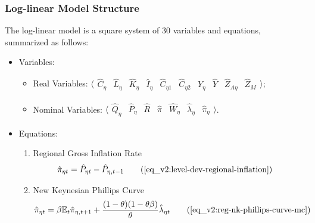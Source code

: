 \documentclass[../thesis.tex]{subfiles}
\begin{document}
\newpage


\subsubsection{Log-linear Model Structure}

The log-linear model is a square system of 30 variables and equations, summarized as follows:

{\singlespacing
	
	\begin{itemize}
		
		\item Variables:
		
		\begin{itemize}
			
			\item Real Variables: $\langle \begin{matrix} \hat{C}_{\eta } & \hat{L}_{\eta } & \hat{K}_{\eta} & \hat{I}_{\eta} & \hat{C}_{\eta 1} & \hat{C}_{\eta 2} & \hat{Y}_{\eta } & \hat{Y}_{} & \hat{Z}_{A\eta } & \hat{Z}_{M} \end{matrix} \rangle$;
			
			\item Nominal Variables: $\langle \begin{matrix} \hat{Q}_{\eta} & \hat{P}_{\eta } & \hat{R}_{} & \hat{\pi}_{} & \hat{W}_{\eta } & \hat{\lambda}_{\eta } & \hat{\pi}_{\eta } \end{matrix} \rangle$.
			
		\end{itemize}
		
		\item Equations:
		
		\begin{enumerate}
			
			\item Regional Gross Inflation Rate
			\begin{align}
				\hat{\pi}_{\eta t} &= \hat{P}_{\eta t} - \hat{P}_{\eta, t-1} \tag{\ref{eq_v2:level-dev-regional-inflation}}
			\end{align}
			
			\item New Keynesian Phillips Curve
			\begin{align}
				\hat{\pi}_{\eta t} &= \beta \E \hat{\pi}_{\eta, t+1} + \frac{(1-\theta) (1- \theta \beta)}{\theta} \hat{\lambda}_{\eta t} \tag{\ref{eq_v2:reg-nk-phillips-curve-mc}}
			\end{align}
			

\end{enumerate}
\end{itemize}}
\end{document}
